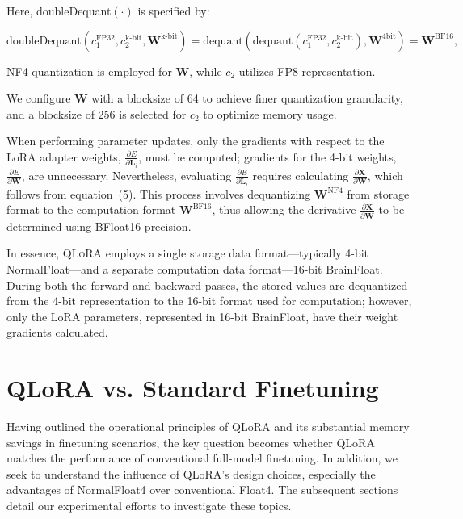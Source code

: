 Here, doubleDequant$(\cdot)$ is specified by:

\begin{equation}
    \text{doubleDequant}(c_1^{\text{FP32}}, c_2^{\text{k-bit}}, \mathbf{W}^{\text{k-bit}}) = \text{dequant}(\text{dequant}(c_1^{\text{FP32}}, c_2^{\text{k-bit}}), \mathbf{W}^{\text{4bit}}) = \mathbf{W}^{\text{BF16}},
\end{equation}

NF4 quantization is employed for $\mathbf{W}$, while $c_2$ utilizes FP8 representation.

We configure $\mathbf{W}$ with a blocksize of 64 to achieve finer quantization granularity, and a blocksize of 256 is selected for $c_2$ to optimize memory usage.

When performing parameter updates, only the gradients with respect to the LoRA adapter weights, $\frac{\partial E}{\partial \mathbf{L}_i}$, must be computed; gradients for the 4-bit weights, $\frac{\partial E}{\partial \mathbf{W}}$, are unnecessary. Nevertheless, evaluating $\frac{\partial E}{\partial \mathbf{L}_i}$ requires calculating $\frac{\partial \mathbf{X}}{\partial \mathbf{W}}$, which follows from equation~(5). This process involves dequantizing $\mathbf{W}^{\text{NF4}}$ from storage format to the computation format $\mathbf{W}^{\text{BF16}}$, thus allowing the derivative $\frac{\partial \mathbf{X}}{\partial \mathbf{W}}$ to be determined using BFloat16 precision.

In essence, \textsc{QLoRA} employs a single storage data format—typically 4-bit NormalFloat—and a separate computation data format—16-bit BrainFloat. During both the forward and backward passes, the stored values are dequantized from the 4-bit representation to the 16-bit format used for computation; however, only the LoRA parameters, represented in 16-bit BrainFloat, have their weight gradients calculated.

\section{QLoRA vs. Standard Finetuning}
\label{sec:comp_to_std}

Having outlined the operational principles of QLoRA and its substantial memory savings in finetuning scenarios, the key question becomes whether QLoRA matches the performance of conventional full-model finetuning. In addition, we seek to understand the influence of QLoRA's design choices, especially the advantages of NormalFloat4 over conventional Float4. The subsequent sections detail our experimental efforts to investigate these topics.

